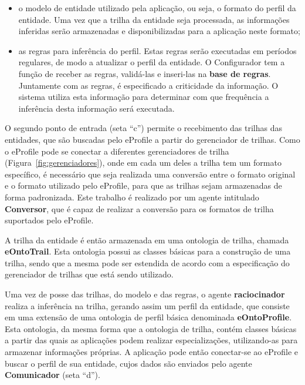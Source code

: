 \documentclass[times, 10pt, twocolumn]{article}
\begin{document}
\begin{itemize}

\item o modelo de entidade utilizado pela aplicação, ou seja, o formato do perfil da entidade. Uma vez que a trilha da entidade seja processada, as informações inferidas serão armazenadas e disponibilizadas para a aplicação neste formato;

\item as regras para inferência do perfil. Estas regras serão executadas em períodos regulares, de modo a atualizar o perfil da entidade. O Configurador tem a função de receber as regras, validá-las e inseri-las na \textbf{base de regras}. Juntamente com as regras, é especificado a criticidade da informação. O sistema utiliza esta informação para determinar com que frequência a inferência desta informação será executada.

\end{itemize}

O segundo ponto de entrada (seta ``c'') permite o recebimento das trilhas das entidades, que são buscadas pelo eProfile a partir do gerenciador de trilhas. Como o eProfile pode se conectar a diferentes gerenciadores de trilha (Figura~\ref{fig:gerenciadores}), onde em cada um deles a trilha tem um formato específico, é necessário que seja realizada uma conversão entre o formato original e o formato utilizado pelo eProfile, para que as trilhas sejam armazenadas de forma padronizada. Este trabalho é realizado por um agente intitulado {\bf Conversor}, que é capaz de realizar a conversão para os formatos de trilha suportados pelo eProfile.

A trilha da entidade é então armazenada em uma ontologia de trilha, chamada {\bf eOntoTrail}. Esta ontologia possui as classes básicas para a construção de uma trilha, sendo que a mesma pode ser estendida de acordo com a especificação do gerenciador de trilhas que está sendo utilizado.

Uma vez de posse das trilhas, do modelo e das regras, o agente \textbf{raciocinador} realiza a inferência na trilha, gerando assim um perfil da entidade, que consiste em uma extensão de uma ontologia de perfil básica denominada {\bf eOntoProfile}. Esta ontologia, da mesma forma que a ontologia de trilha, contém classes básicas a partir das quais as aplicações podem realizar especializações, utilizando-as para armazenar informações próprias. A aplicação pode então conectar-se ao eProfile e buscar o perfil de sua entidade, cujos dados são enviados pelo agente \textbf{Comunicador} (seta ``d'').
\end{document}
